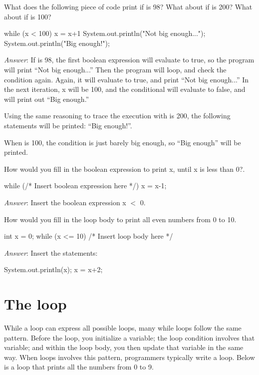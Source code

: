 \begin{example}
What does the following piece of code print if  is 98? What about if  is 200? What about if  is 100?

\begin{code}
while (x < 100) {
    x = x+1
    System.out.println("Not big enough...");
} 
System.out.println("Big enough!");
\end{code}

\emph{Answer}: If  is 98, the first boolean expression will evaluate to
true, so the program will print ``Not big enough...'' Then the program will
loop, and check the condition again.  Again, it will evaluate to true, and print
``Not big enough...'' In the next iteration, x will be 100, and the conditional
will evaluate to false, and will print out ``Big enough.''

Using the same reasoning to trace the execution with  is 200, the
following statements will be printed: ``Big enough!''.

When  is 100, the condition is just barely big enough, so ``Big enough''
will be printed.
\end{example}

\begin{example}
How would you fill in the boolean expression to print x, until x is less than 0?.

\begin{code}
while (/* Insert boolean expression here */) {
    x = x-1;
} 
\end{code}

\emph{Answer}: Insert the boolean expression x $<$ 0.
\end{example}

\begin{example}
How would you fill in the loop body to print all even numbers from 0 to 10.

\begin{code}
int x = 0;
while (x <= 10) {
    /* Insert loop body here */
} 
\end{code}

\emph{Answer}: Insert the statements:
\begin{code}
  System.out.println(x);
  x = x+2;
\end{code}
\end{example}

\section{The  loop}
While a  loop can express all possible loops, many while loops follow
the same pattern. Before the loop, you initialize a variable; the loop condition
involves that variable; and within the loop body, you then update that variable
in the same way. When loops involves this pattern, programmers typically write a
 loop. Below is a  loop that prints all the numbers from 0 to 9.


